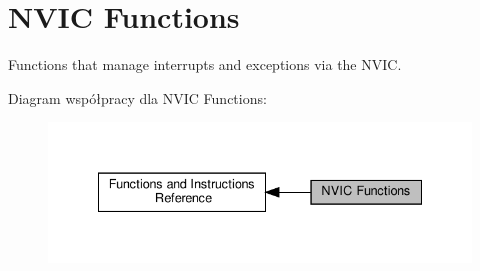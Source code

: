 \hypertarget{group___c_m_s_i_s___core___n_v_i_c_functions}{}\section{N\+V\+IC Functions}
\label{group___c_m_s_i_s___core___n_v_i_c_functions}


Functions that manage interrupts and exceptions via the N\+V\+IC.  


Diagram współpracy dla N\+V\+IC Functions\+:\nopagebreak
\begin{figure}[H]
\begin{center}
\leavevmode
\includegraphics[width=335pt]{group___c_m_s_i_s___core___n_v_i_c_functions}
\end{center}
\end{figure}
